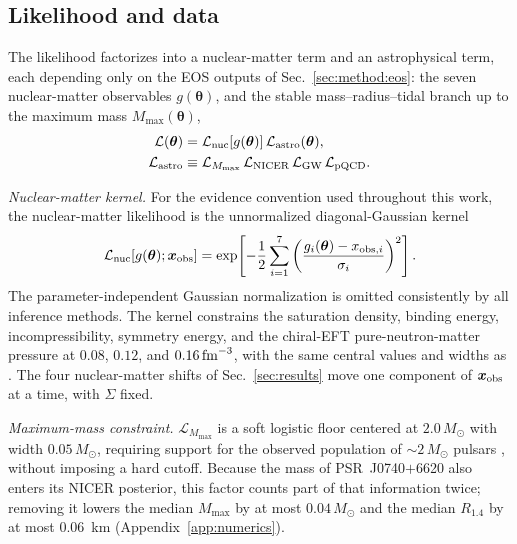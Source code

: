 \documentclass[aps,prd,twocolumn,superscriptaddress,nofootinbib,longbibliography]{revtex4-2}
\newcommand{\msun}{\ensuremath{M_\odot}}
\begin{document}
\subsection{Likelihood and data}
\label{sec:method:like}

The likelihood factorizes into a nuclear-matter term and an astrophysical
term, each depending only on the EOS outputs of
Sec.~\ref{sec:method:eos}: the seven nuclear-matter observables
$g(\bm\theta)$, and the stable mass--radius--tidal branch up to the
maximum mass $M_{\max}(\bm\theta)$,
\begin{align}
\mathcal{L}(\bm\theta) &= \mathcal{L}_{\rm nuc}[g(\bm\theta)]\,
\mathcal{L}_{\rm astro}(\bm\theta), \label{eq:likelihood}\\
\mathcal{L}_{\rm astro} &\equiv \mathcal{L}_{M_{\max}}\,
\mathcal{L}_{\rm NICER}\,\mathcal{L}_{\rm GW}\,\mathcal{L}_{\rm pQCD}.
\end{align}

\emph{Nuclear-matter kernel.} For the evidence convention used
throughout this work, the nuclear-matter likelihood is the unnormalized
diagonal-Gaussian kernel
\[
\mathcal{L}_{\rm nuc}[g(\bm\theta);\bm{x}_{\rm obs}]
=\exp\!\left[-\frac{1}{2}
\sum_{i=1}^{7}
\left(\frac{g_i(\bm\theta)-x_{{\rm obs},i}}{\sigma_i}\right)^2\right].
\]
The parameter-independent Gaussian normalization is omitted consistently
by all inference methods. The kernel constrains the
saturation density, binding energy, incompressibility, symmetry energy, and the
chiral-EFT pure-neutron-matter pressure at $0.08$, $0.12$, and
$0.16\,{\rm fm}^{-3}$, with the same central values and widths as
\cite{Thakur:2026dpr}. The four nuclear-matter shifts of
Sec.~\ref{sec:results} move one component of $\bm{x}_{\rm obs}$ at a time,
with $\Sigma$ fixed.

\emph{Maximum-mass constraint.} $\mathcal{L}_{M_{\max}}$ is a soft logistic floor
centered at $2.0\,\msun$ with width $0.05\,\msun$, requiring support for
the observed population of ${\sim}2\,\msun$ pulsars
\cite{Antoniadis:2013pzd,Fonseca:2021wxt}, without
imposing a hard cutoff. Because the mass of PSR~J0740$+$6620 also enters its NICER
posterior, this factor counts part of that information twice; removing it
lowers the median $M_{\max}$ by at most $0.04\,\msun$ and the median $R_{1.4}$
by at most $0.06$~km (Appendix~\ref{app:numerics}).
\end{document}

